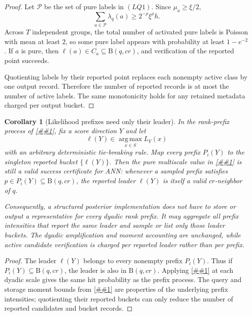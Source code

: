 \documentclass[10pt]{article}
\newcommand{\cref}[1]{\ref{##1}}
\newtheorem{corollary}[theorem]{Corollary}
\theoremstyle{definition}
\newcommand{\Ball}{\mathrm{B}}
\begin{document}
\begin{proof}
   Let \(\mathcal P\) be the set of pure labels in \((LQ1)\).  Since
   \(\mu_a\ge\xi/2\),
   \[
      \sum_{a\in\mathcal P}\lambda_q(a)
      \ge
      2^{-\rho}\xi^\rho h .
   \]
   Across \(T\) independent groups, the total number of activated pure labels
   is Poisson with mean at least \(2\), so some pure label appears with
   probability at least \(1-e^{-2}\).  If \(a\) is pure, then
   \(\ell(a)\in C_a\subseteq\Ball(q,cr)\), and verification of the reported
   point succeeds.

   Quotienting labels by their reported point replaces each nonempty active
   class by one output record.  Therefore the number of reported records is at
   most the number of active labels.  The same monotonicity holds for any
   retained metadata charged per output bucket.
\end{proof}

\begin{corollary}[Likelihood prefixes need only their leader]
   \label{cor:likelihood-prefix-leader}
   In the rank-prefix process of \cref{lem:likelihood-rank-prefix}, fix a score
   direction \(Y\) and let
   \[
      \ell(Y)\in\operatorname*{arg\,max}_{x\in S} L_Y(x)
   \]
   with an arbitrary deterministic tie-breaking rule.  Map every prefix
   \(P_i(Y)\) to the singleton reported bucket \(\{\ell(Y)\}\).  Then the pure
   multiscale value in \cref{lem:ideal-likelihood-scale-profile} is still a
   valid success certificate for ANN: whenever a sampled prefix satisfies
   \(p\in P_i(Y)\subseteq\Ball(q,cr)\), the reported leader \(\ell(Y)\) is
   itself a valid \(cr\)-neighbor of \(q\).

   Consequently, a structured posterior implementation does not have to store
   or output a representative for every dyadic rank prefix.  It may aggregate
   all prefix intensities that report the same leader and sample or list only
   those leader buckets.  The dyadic amplification and moment accounting are
   unchanged, while active candidate verification is charged per reported
   leader rather than per prefix.
\end{corollary}

\begin{proof}
   The leader \(\ell(Y)\) belongs to every nonempty prefix \(P_i(Y)\).  Thus if
   \(P_i(Y)\subseteq\Ball(q,cr)\), the leader is also in \(\Ball(q,cr)\).
   Applying \cref{lem:pure-prefix-leader-quotient} at each dyadic scale gives
   the same hit probability as the prefix process.  The query and storage
   moment bounds from \cref{lem:ideal-likelihood-scale-profile} are properties
   of the underlying prefix intensities; quotienting their reported buckets can
   only reduce the number of reported candidates and bucket records.
\end{proof}
\end{document}
